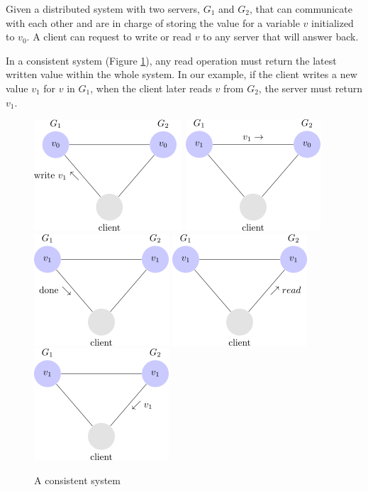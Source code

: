 Given a distributed system with two servers, $G_{1}$ and $G_{2}$, that can communicate with each other and are in charge of storing the value for a variable $v$ initialized to $v_{0}$. A client can request to write or read $v$ to any server that will answer back.

In a consistent system (Figure \ref{fig:consisten_system}), any read operation must return the latest written value within the whole system. In our example, if the client writes a new value $v_{1}$ for $v$ in $G_{1}$, when the client later reads $v$ from $G_{2}$, the server must return $v_{1}$.
\begin{figure}[h!]
\centering
    \includegraphics[scale=0.45]{assets/images/cap12.png}
    \includegraphics[scale=0.6]{assets/images/cap14.png}
    \includegraphics[scale=0.6]{assets/images/cap17.png}
    \includegraphics[scale=0.6]{assets/images/cap18.png}
    \includegraphics[scale=0.6]{assets/images/cap19.png}
    \caption{A consistent system}
    \label{fig:consisten_system}
\end{figure}

